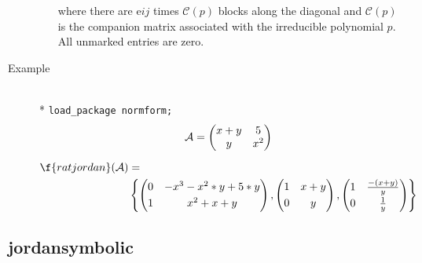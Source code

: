 \begin{description}
\begin{itemize}
      where there are e${ij}$ times $\mathcal{C}(p)$ blocks 
      along the diagonal and $\mathcal{C}(p)$ is the companion 
      matrix  associated with the irreducible polynomial $p$. All 
      unmarked entries are zero.
\end{itemize}

\item[Example]\mbox{}\\*
\texttt{load\_package normform;}
\begin{gather*}
\mathcal{A} = \begin{pmatrix} x+y & 5 \\ y & x^2  \end{pmatrix} \\[2mm]
\begin{split}
\f{ratjordan}(\mathcal{A}) &= \\ 
& \left\{
    \begin{pmatrix} 0 & -x^3-x^2*y+5*y \\[1mm] 1 & x^2+x+y \end{pmatrix},
    \begin{pmatrix} 1 & x+y \\[1mm] 0 & y \end{pmatrix},
    \begin{pmatrix} 1 & \frac{-(x+y)}{y} \\[1mm] 0 &  \frac{1}{y} \end{pmatrix} 
  \right\}
\end{split}
\end{gather*}
\end{description}

\subsection{jordansymbolic}

